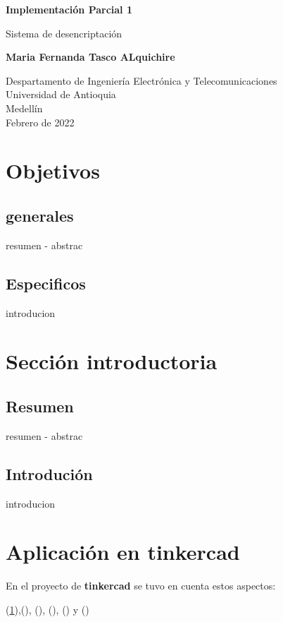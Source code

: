 \documentclass{article}
\begin{document}
\begin{titlepage}
    \begin{center}
        \vspace*{1cm}
            
        \Huge
        \textbf{Implementación Parcial 1}
            
        \vspace{0.5cm}
        \LARGE
        Sistema de desencriptación 
            
        \vspace{5cm}
            
        \textbf{Maria Fernanda Tasco ALquichire}
            
        \vfill
            
        \vspace{0.8cm}
            
        \Large
        Despartamento de Ingeniería Electrónica y Telecomunicaciones\\
        Universidad de Antioquia\\
        Medellín\\
        Febrero de 2022
            
    \end{center}
\end{titlepage}

\tableofcontents
\newpage

\section{Objetivos}\label{intro1}
\subsection{generales}
resumen - abstrac
\subsection{Especificos}
introducion

\section{Sección introductoria}\label{intro2}
\subsection{Resumen}
resumen - abstrac
\subsection{Introdución}
introducion

\section{Aplicación en tinkercad}\label{practica}
En el proyecto de  \textbf{tinkercad } \cite{implementacion} se tuvo en cuenta estos aspectos:





(\ref{intro1}),(\label{intro2}), (\label{investigación}), (\label{practica}), (\label{conclusiones}) y (\label{practica})


\end{document}
